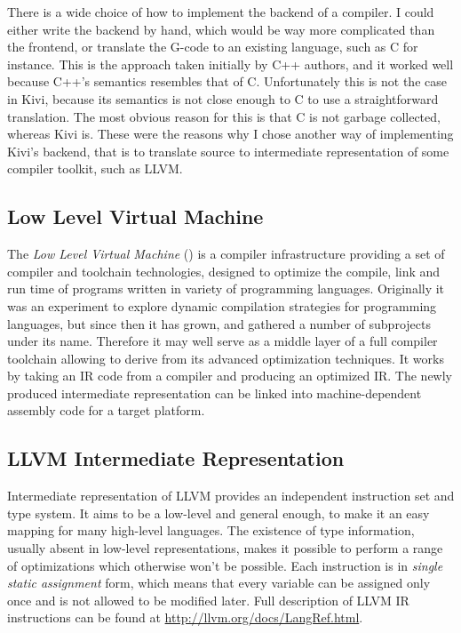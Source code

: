 \documentclass[12pt,a4paper]{report}
\begin{document}
There is a wide choice of how to implement the backend of a compiler. I could
either write the backend by hand, which would be way more complicated than the
frontend, or translate the G-code to an existing language, such as C for
instance. This is the approach taken initially by C++ authors, and it worked
well because C++'s semantics resembles that of C. Unfortunately this is not the
case in Kivi, because its semantics is not close enough to C to use a
straightforward translation. The most obvious reason for this is that C is not
garbage collected, whereas Kivi is. These were the reasons why I chose another
way of implementing Kivi's backend, that is to translate source to intermediate
representation of some compiler toolkit, such as LLVM.

\subsection{Low Level Virtual Machine}
The \textit{Low Level Virtual Machine} (\cite{website:llvm}) is a compiler
infrastructure providing a set of compiler and toolchain technologies, designed
to optimize the compile, link and run time of programs written in variety of
programming languages. Originally it was an experiment to explore dynamic
compilation strategies for programming languages, but since then it has grown,
and gathered a number of subprojects under its name. Therefore it may well
serve as a middle layer of a full compiler toolchain allowing to derive from
its advanced optimization techniques. It works by taking an IR code from a
compiler and producing an optimized IR. The newly produced intermediate
representation can be linked into machine-dependent assembly code for a target
platform.

\subsection{LLVM Intermediate Representation}
Intermediate representation of LLVM provides an independent instruction set and
type system. It aims to be a low-level and general enough, to make it an easy
mapping for many high-level languages. The existence of type information,
usually absent in low-level representations, makes it possible to perform a
range of optimizations which otherwise won't be possible. Each instruction is
in \textit{single static assignment} form, which means that every variable can
be assigned only once and is not allowed to be modified later. Full description
of LLVM IR instructions can be found at \url{http://llvm.org/docs/LangRef.html}.
\end{document}
